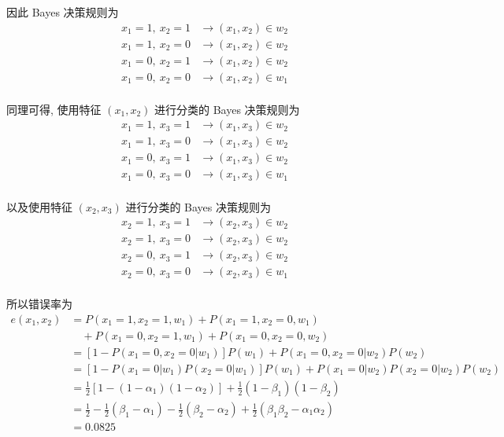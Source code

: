 \documentclass[openany]{ctexbook}
\theoremstyle{kaiti}
\theoremstyle{normal}
\begin{document}
因此 Bayes 决策规则为
\begin{equation}
  \begin{aligned}
    x_1=1,~x_2=1&\to (x_1,x_2)\in w_2\\
    x_1=1,~x_2=0&\to (x_1,x_2)\in w_2\\
    x_1=0,~x_2=1&\to (x_1,x_2)\in w_2\\
    x_1=0,~x_2=0&\to (x_1,x_2)\in w_1\\
  \end{aligned}
\end{equation}

同理可得, 使用特征 $(x_1,x_2)$ 进行分类的 Bayes 决策规则为
\begin{equation}
  \begin{aligned}
    x_1=1,~x_3=1&\to (x_1,x_3)\in w_2\\
    x_1=1,~x_3=0&\to (x_1,x_3)\in w_2\\
    x_1=0,~x_3=1&\to (x_1,x_3)\in w_2\\
    x_1=0,~x_3=0&\to (x_1,x_3)\in w_1\\
  \end{aligned}
\end{equation}

以及使用特征 $(x_2,x_3)$ 进行分类的 Bayes 决策规则为
\begin{equation}
  \begin{aligned}
    x_2=1,~x_3=1&\to (x_2,x_3)\in w_2\\
    x_2=1,~x_3=0&\to (x_2,x_3)\in w_2\\
    x_2=0,~x_3=1&\to (x_2,x_3)\in w_2\\
    x_2=0,~x_3=0&\to (x_2,x_3)\in w_1\\
  \end{aligned}
\end{equation}

所以错误率为
\begin{equation}
  \begin{aligned}
    e(x_1,x_2)
    &=P(x_1=1,x_2=1,w_1)+P(x_1=1,x_2=0,w_1)\\
    &\quad+P(x_1=0,x_2=1,w_1)+P(x_1=0,x_2=0,w_2)\\
    &=[1-P(x_1=0,x_2=0|w_1)]P(w_1)+P(x_1=0,x_2=0|w_2)P(w_2)\\
    &=[1-P(x_1=0|w_1)P(x_2=0|w_1)]P(w_1)+P(x_1=0|w_2)P(x_2=0|w_2)P(w_2)\\
    &=\frac{1}{2}[1-(1-\alpha_1)(1-\alpha_2)]+\frac{1}{2}(1-\beta_1)(1-\beta_2)\\
    &=\frac{1}{2}-\frac{1}{2}(\beta_1-\alpha_1)-\frac{1}{2}(\beta_2-\alpha_2)+\frac{1}{2}(\beta_1\beta_2-\alpha_1\alpha_2)\\
    &=0.0825
  \end{aligned}
\end{equation}
\end{document}

